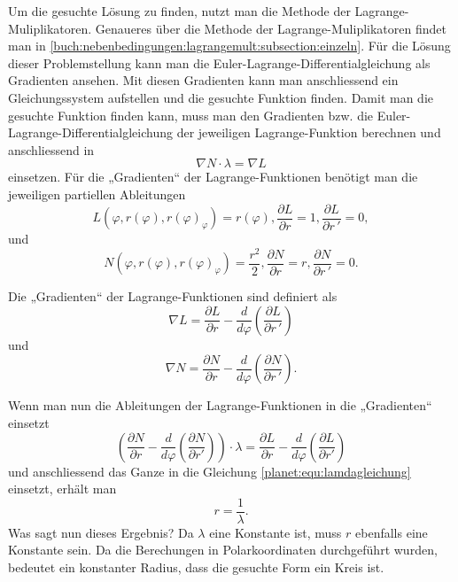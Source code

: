 Um die gesuchte Lösung zu finden, nutzt man die Methode der Lagrange-Muliplika\-to\-ren.
Genaueres über die Methode der Lagrange-Muliplikatoren findet man in \cref{buch:nebenbedingungen:lagrangemult:subsection:einzeln}.
Für die Lösung dieser Problemstellung kann man die Euler-Lagrange-Differentialgleichung als Gradienten ansehen.
Mit diesen Gradienten kann man anschliessend ein Gleichungssystem aufstellen und die gesuchte Funktion finden.
Damit man die gesuchte Funktion finden kann, muss man den Gradienten bzw. die Euler-Lagrange-Differentialgleichung der jeweiligen Lagrange-Funktion berechnen und anschliessend in
\begin{equation}
	\nabla N \cdot \lambda = \nabla L
	\label{planet:equ:lamdagleichung}
\end{equation}
einsetzen.
Für die „Gradienten“ der Lagrange-Funktionen benötigt man die jeweiligen partiellen Ableitungen
\begin{equation*}
	L(\varphi ,r(\varphi),r(\varphi)_\varphi) = r(\varphi),
	\frac{\partial L}{\partial r} = 1,
	\frac{\partial L}{\partial r\,'} = 0,
\end{equation*}
und
\begin{equation*}
	N(\varphi ,r(\varphi),r(\varphi)_\varphi) = \frac{r^2}{2} ,
	\frac{\partial N}{\partial r} = r,
	\frac{\partial N}{\partial r\,'} = 0.
\end{equation*}

\noindent
Die „Gradienten“ der Lagrange-Funktionen sind definiert als 
\begin{equation*}
	\nabla L = 
	\frac{\partial L}{\partial r}-  \frac{d}{d\varphi}\left( \frac{\partial L}{\partial r\,'} \right)
\end{equation*}
und
\begin{equation*}
	\nabla N = \frac{\partial N}{\partial r} - \frac{d}{d\varphi}\left(\frac{\partial N}{\partial r\,'}\right).
\end{equation*}

\noindent
Wenn man nun die Ableitungen der Lagrange-Funktionen in die „Gradienten“ einsetzt
\begin{equation*}
	\left(\frac{\partial N}{\partial r} - \frac{d}{d\varphi}\left(\frac{\partial N}{\partial r'}\right)\right)\cdot \lambda = \frac{\partial L}{\partial r}-  \frac{d}{d\varphi}\left( \frac{\partial L}{\partial r'} \right)
\end{equation*} 
und anschliessend das Ganze in die Gleichung \eqref{planet:equ:lamdagleichung} einsetzt, erhält man
\begin{equation*}
	r = \frac{1}{\lambda}.
\end{equation*}
Was sagt nun dieses Ergebnis?
Da \(\lambda\) eine Konstante ist, muss \(r\) ebenfalls eine Konstante sein.
Da die Berechungen in Polarkoordinaten durchgeführt wurden, bedeutet ein konstanter Radius, dass die gesuchte Form ein Kreis ist.

